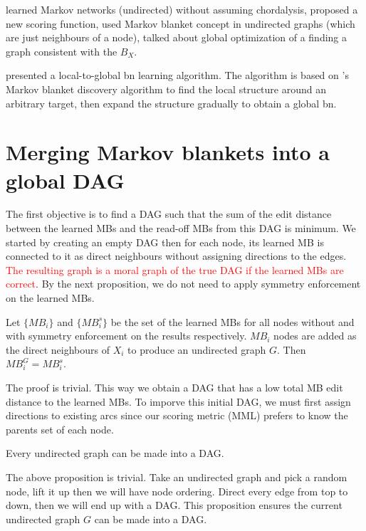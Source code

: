 \cite{pensar2014marginal} learned Markov networks (undirected) without assuming chordalysis, proposed a new scoring function, used Markov blanket concept in undirected graphs (which are just neighbours of a node), talked about global optimization of a finding a graph consistent with the $B_X$. 

\cite{gao2017local} presented a local-to-global bn learning algorithm. The algorithm is based on \cite{gao2017efficient}'s Markov blanket discovery algorithm to find the local structure around an arbitrary target, then expand the structure gradually to obtain a global bn.

\section{Merging Markov blankets into a global DAG}
The first objective is to find a DAG such that the sum of the edit distance between the learned MBs and the read-off MBs from this DAG is minimum. We started by creating an empty DAG then for each node, its learned MB is connected to it as direct neighbours without assigning directions to the edges. \textcolor{red}{The resulting graph is a moral graph of the true DAG if the learned MBs are correct}. By the next proposition, we do not need to apply symmetry enforcement on the learned MBs. 
\begin{proposition}
Let $\{MB_i\}$ and $\{MB^s_i\}$ be the set of the learned MBs for all nodes without and with symmetry enforcement on the results respectively. $MB_i$ nodes are added as the direct neighbours of $X_i$ to produce an undirected graph $G$. Then $MB^G_i = MB^s_i$. 
\end{proposition}
The proof is trivial. This way we obtain a DAG that has a low total MB edit distance to the learned MBs. To imporve this initial DAG, we must first assign directions to existing arcs since our scoring metric (MML) prefers to know the parents set of each node. 
\begin{proposition}
Every undirected graph can be made into a DAG. 
\end{proposition}
The above proposition is trivial. Take an undirected graph and pick a random node, lift it up then we will have node ordering. Direct every edge from top to down, then we will end up with a DAG. This proposition ensures the current undirected graph $G$ can be made into a DAG. 

